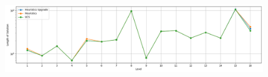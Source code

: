 \documentclass[12pt]{article}
\begin{document}
\begin{figure}[h]
	\hspace{-3em}\includegraphics[scale=0.50]{NumberOfMoves.png}
\end{figure}
\end{document}
